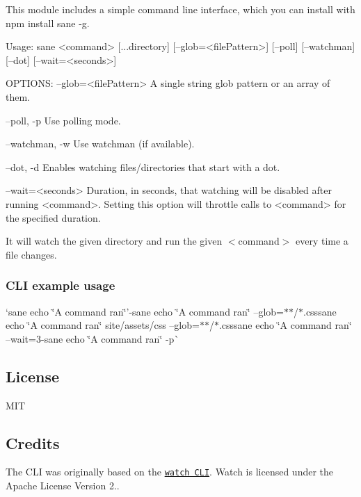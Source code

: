 This module includes a simple command line interface, which you can install with {\ttfamily npm install sane -\/g}.


\begin{DoxyCode}
Usage: sane <command> [...directory] [--glob=<filePattern>] [--poll] [--watchman] [--dot]
       [--wait=<seconds>]

OPTIONS:
    --glob=<filePattern>
        A single string glob pattern or an array of them.

    --poll, -p
      Use polling mode.

    --watchman, -w
      Use watchman (if available).

    --dot, -d
      Enables watching files/directories that start with a dot.

    --wait=<seconds>
        Duration, in seconds, that watching will be disabled
        after running <command>. Setting this option will
        throttle calls to <command> for the specified duration.
\end{DoxyCode}


It will watch the given {\ttfamily directory} and run the given $<$command$>$ every time a file changes.

\subsubsection*{C\+LI example usage}


\begin{DoxyItemize}
\item `sane \textquotesingle{}echo \char`\"{}\+A command ran\char`\"{}'{\ttfamily  -\/}sane \textquotesingle{}echo \char`\"{}\+A command ran\char`\"{}\textquotesingle{} --glob=\textquotesingle{}$\ast$$\ast$/$\ast$.css\textquotesingle{}{\ttfamily  -\/}sane \textquotesingle{}echo \char`\"{}\+A command ran\char`\"{}\textquotesingle{} site/assets/css --glob=\textquotesingle{}$\ast$$\ast$/$\ast$.css\textquotesingle{}{\ttfamily  -\/}sane \textquotesingle{}echo \char`\"{}\+A command ran\char`\"{}\textquotesingle{} --wait=3{\ttfamily  -\/}sane \textquotesingle{}echo \char`\"{}\+A command ran\char`\"{}\textquotesingle{} -\/p\`{}
\end{DoxyItemize}

\subsection*{License}

M\+IT

\subsection*{Credits}

The C\+LI was originally based on the \href{https://github.com/mikeal/watch}{\tt watch C\+LI}. Watch is licensed under the Apache License Version 2.. 